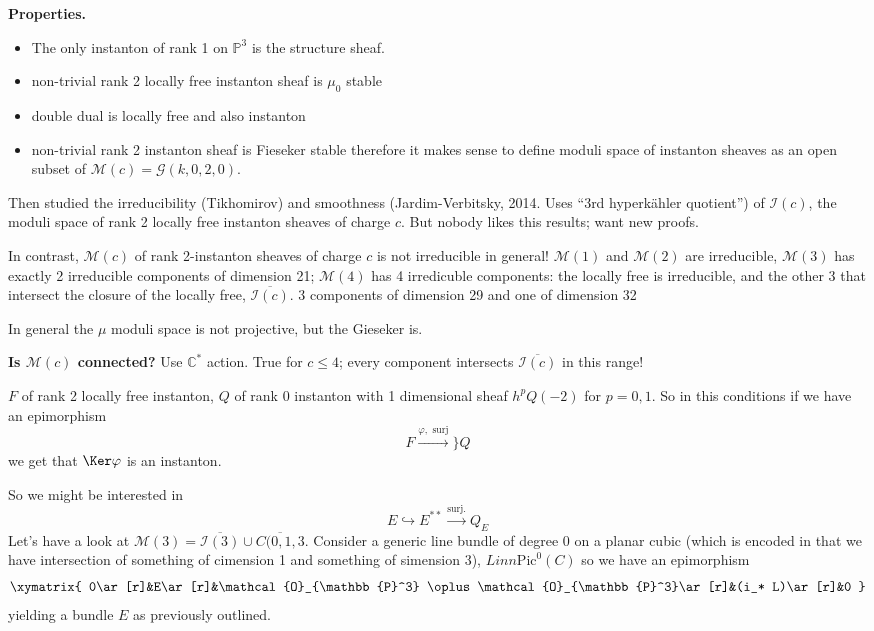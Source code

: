 \documentclass{book}
\begin{document}
\noindent
{\bf Properties.}
\begin{itemize}
\item The only instanton of rank 1 on
$\mathbb{P}^3$ is
the structure sheaf.
\item non-trivial rank 2 locally free
instanton sheaf is  $\mu_0$ stable
\item double dual is locally free and
also instanton
\item non-trivial rank 2 instanton sheaf
is Fieseker stable
therefore it makes sense to define
moduli space of instanton sheaves as
an open subset of
$\mathcal{M}(c)=\mathcal{G}(k,0,2,0)$.
\end{itemize}

Then studied the irreducibility (Tikhomirov)
and smoothness (Jardim-Verbitsky, 2014. Uses
``3rd hyperkähler quotient'') of
$\mathcal{I}(c)$, the moduli space of rank 2
locally free instanton sheaves of charge $c.$
But nobody likes this results; want new
proofs.

In contrast, $\mathcal{M}(c)$ of rank
2-instanton sheaves of charge $c$ is not
irreducible in general! $\mathcal{M}(1)$ and
$\mathcal{M}(2)$ are irreducible,
$\mathcal{M}(3)$ has exactly 2 irreducible
components of dimension 21; $\mathcal{M}(4)$
has 4 irredicuble components: the locally
free is irreducible, and the other 3 that
intersect the closure of the locally free,
$\overline{\mathcal{I}(c)}$. 3 components of
dimension 29 and one of dimension 32

\begin{remark}
\label{remark-gieseker}
In general the $\mu$ moduli space is
not projective, but the Gieseker is.
\end{remark}

\noindent
{\bf Is $\mathcal{M}(c)$ connected?} Use
$\mathbb{C}^*$ action. True for $c \leq 4$;
every component intersects
$\overline{\mathcal{I}(c)}$ in this range!

\begin{definition}
\label{definition-elementary-transformation}
$F$ of rank 2 locally free instanton,
$Q$ of rank 0 instanton with 1 dimensional
sheaf $h^p Q(-2)$ for $p = 0,1$.
So in this conditions if we have an
epimorphism
 $$
F \overset{\varphi,\text{ surj}}{\to}\} Q
$$
we get that $\Ker \varphi$ is an instanton.
\end{definition}

So  we might be interested in
$$
E \hookrightarrow E^{*
*}\xrightarrow{\text{surj.}} Q_E
$$
Let's have a look at
$\mathcal{M}(3)=\overline{\mathcal{I}(3)}\cup
\overline{C(0,1,3}$. Consider a generic line
bundle of degree 0 on a planar cubic (which
is encoded in that we have intersection of
something of cimension 1 and something of
simension 3), $L inn \text{Pic}^0(C)$ so we
have an epimorphism
$$
\xymatrix{
0\ar[r]&E\ar[r]&\mathcal{O}_{\mathbb{P}^3}
\oplus
\mathcal{O}_{\mathbb{P}^3}\ar[r]&(i_*
L)\ar[r]&0
}
$$
yielding a bundle $E$ as previously outlined.
\end{document}
